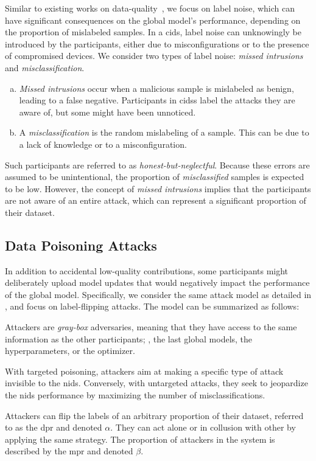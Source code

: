 Similar to existing works on data-quality~\cite{deng_FAIRQualityAwareFederated_2021,deng_AUCTIONAutomatedQualityAware_2022}, we focus on label noise, which can have significant consequences on the global model's performance, depending on the proportion of mislabeled samples.
In a \gls{cids}, label noise can unknowingly be introduced by the participants, either due to misconfigurations or to the presence of compromised devices.
We consider two types of label noise: \emph{missed intrusions} and \emph{misclassification}.
\begin{enumerate}[a)]
  \item \emph{Missed intrusions} occur when a malicious sample is mislabeled as benign, leading to a false negative. Participants in \glspl{cids} label the attacks they are aware of, but some might have been unnoticed.
  \item A \emph{misclassification} is the random mislabeling of a sample. This can be due to a lack of knowledge or to a misconfiguration.
\end{enumerate}
Such participants are referred to as \emph{honest-but-neglectful}.
Because these errors are assumed to be unintentional, the proportion of \emph{misclassified} samples is expected to be low.
However, the concept of \emph{missed intrusions} implies that the participants are not aware of an entire attack, which can represent a significant proportion of their dataset.


\subsection{Data Poisoning Attacks\label{sec:radar.problem.poisoning}}

In addition to accidental low-quality contributions, some participants might deliberately upload model updates that would negatively impact the performance of the global model.
Specifically, we consider the same attack model as detailed in , and focus on label-flipping attacks.
The model can be summarized as follows:
\begin{description}[font=\normalfont\itshape, leftmargin=2em]
  \item[Attackers' Knowledge.] Attackers are \emph{gray-box} adversaries, meaning that they have access to the same information as the other participants; \eg, the last global models, the hyperparameters, or the optimizer.
  \item[Attackers' Objective.] With targeted poisoning, attackers aim at making a specific type of attack invisible to the \gls{nids}.
  Conversely, with untargeted attacks, they seek to jeopardize the \gls{nids} performance by maximizing the number of misclassifications.
  \item[Attackers' Capabilities.] Attackers can flip the labels of an arbitrary proportion of their dataset, referred to as the \gls{dpr} and denoted $\alpha$.
  They can act alone or in collusion with other by applying the same strategy.
  The proportion of attackers in the system is described by the \gls{mpr} and denoted $\beta$. 
\end{description}

